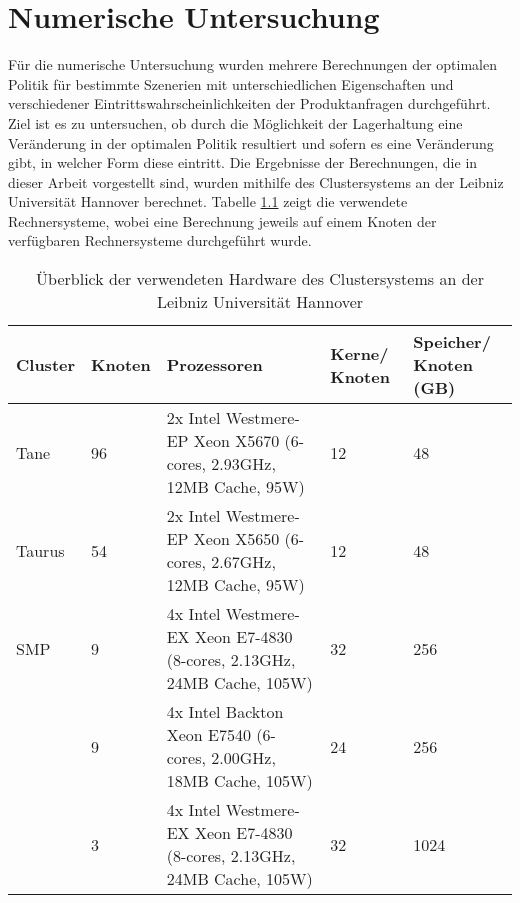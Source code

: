 \chapter{Numerische Untersuchung}
\setcounter{footnote}{4}  %

Für die numerische Untersuchung wurden mehrere Berechnungen der optimalen Politik für bestimmte Szenerien mit unterschiedlichen Eigenschaften und verschiedener Eintrittswahrscheinlichkeiten der Produktanfragen durchgeführt. Ziel ist es zu untersuchen, ob durch die Möglichkeit der Lagerhaltung eine Veränderung in der optimalen Politik resultiert und sofern es eine Veränderung gibt, in welcher Form diese eintritt. Die Ergebnisse der Berechnungen, die in dieser Arbeit vorgestellt sind, wurden mithilfe des Clustersystems an der Leibniz Universität Hannover berechnet. Tabelle \ref{Hardware} zeigt die verwendete Rechnersysteme, wobei eine Berechnung jeweils auf einem Knoten der verfügbaren Rechnersysteme durchgeführt wurde.

\begin{table}[h!]
\renewcommand{\arraystretch}{1.5}
  \begin{center}
  \begin{small}
    \caption{Überblick der verwendeten Hardware des Clustersystems an der Leibniz Universität Hannover}  \label{Hardware}
    \vspace*{3mm}
    \begin{tabular}{llp{6cm}p{1.5cm}p{1.5cm}}   %
     Cluster & Knoten  & Prozessoren & Kerne/ Knoten  & Speicher/ Knoten (GB) \\  \hline
  Tane   & 96 & 2x Intel Westmere-EP Xeon X5670 (6-cores, 2.93GHz, 12MB Cache, 95W)  & 12 & 48 \\
   Taurus  & 54 & 2x Intel Westmere-EP Xeon X5650 (6-cores, 2.67GHz, 12MB Cache, 95W)  & 12 &  48 \\
   SMP  & 9 &4x Intel Westmere-EX Xeon E7-4830 (8-cores, 2.13GHz, 24MB Cache, 105W)   & 32 & 256  \\
    & 9 & 4x Intel Backton Xeon E7540 (6-cores, 2.00GHz, 18MB Cache, 105W)   & 24 & 256 \\
      & 3 & 4x Intel Westmere-EX Xeon E7-4830 (8-cores, 2.13GHz, 24MB Cache, 105W)   & 32 & 1024  \\ \hline
    \end{tabular} \\[3mm]
    \end{small}
  \end{center}
\end{table}

